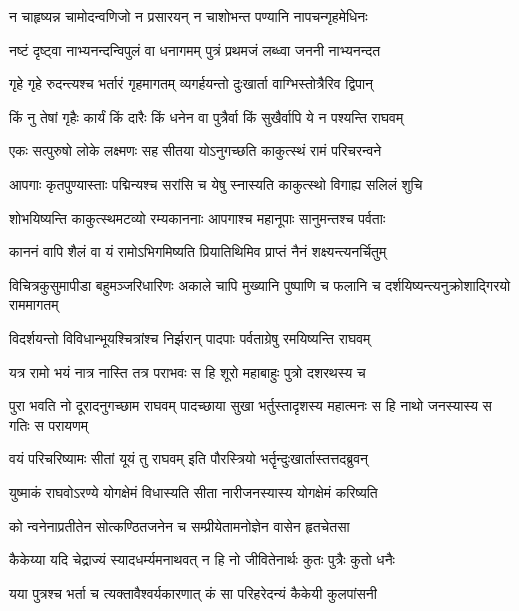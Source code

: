 \twolineshloka
{न चाहृष्यन्न चामोदन्वणिजो न प्रसारयन्}
{न चाशोभन्त पण्यानि नापचन्गृहमेधिनः} %

\twolineshloka
{नष्टं दृष्ट्वा नाभ्यनन्दन्विपुलं वा धनागमम्}
{पुत्रं प्रथमजं लब्ध्वा जननी नाभ्यनन्दत} %

\twolineshloka
{गृहे गृहे रुदन्त्यश्च भर्तारं गृहमागतम्}
{व्यगर्हयन्तो दुःखार्ता वाग्भिस्तोत्रैरिव द्विपान्} %

\twolineshloka
{किं नु तेषां गृहैः कार्यं किं दारैः किं धनेन वा}
{पुत्रैर्वा किं सुखैर्वापि ये न पश्यन्ति राघवम्} %

\twolineshloka
{एकः सत्पुरुषो लोके लक्ष्मणः सह सीतया}
{योऽनुगच्छति काकुत्स्थं रामं परिचरन्वने} %

\twolineshloka
{आपगाः कृतपुण्यास्ताः पद्मिन्यश्च सरांसि च}
{येषु स्नास्यति काकुत्स्थो विगाह्य सलिलं शुचि} %

\twolineshloka
{शोभयिष्यन्ति काकुत्स्थमटव्यो रम्यकाननाः}
{आपगाश्च महानूपाः सानुमन्तश्च पर्वताः} %

\twolineshloka
{काननं वापि शैलं वा यं रामोऽभिगमिष्यति}
{प्रियातिथिमिव प्राप्तं नैनं शक्ष्यन्त्यनर्चितुम्} %

\threelineshloka
{विचित्रकुसुमापीडा बहुमञ्जरिधारिणः}
{अकाले चापि मुख्यानि पुष्पाणि च फलानि च}
{दर्शयिष्यन्त्यनुक्रोशाद्गिरयो राममागतम्} %

\twolineshloka
{विदर्शयन्तो विविधान्भूयश्चित्रांश्च निर्झरान्}
{पादपाः पर्वताग्रेषु रमयिष्यन्ति राघवम्} %

\twolineshloka
{यत्र रामो भयं नात्र नास्ति तत्र पराभवः}
{स हि शूरो महाबाहुः पुत्रो दशरथस्य च} %

\threelineshloka
{पुरा भवति नो दूरादनुगच्छाम राघवम्}
{पादच्छाया सुखा भर्तुस्तादृशस्य महात्मनः}
{स हि नाथो जनस्यास्य स गतिः स परायणम्} %

\twolineshloka
{वयं परिचरिष्यामः सीतां यूयं तु राघवम्}
{इति पौरस्त्रियो भर्तॄन्दुःखार्तास्तत्तदब्रुवन्} %

\twolineshloka
{युष्माकं राघवोऽरण्ये योगक्षेमं विधास्यति}
{सीता नारीजनस्यास्य योगक्षेमं करिष्यति} %

\twolineshloka
{को न्वनेनाप्रतीतेन सोत्कण्ठितजनेन च}
{सम्प्रीयेतामनोज्ञेन वासेन हृतचेतसा} %

\twolineshloka
{कैकेय्या यदि चेद्राज्यं स्यादधर्म्यमनाथवत्}
{न हि नो जीवितेनार्थः कुतः पुत्रैः कुतो धनैः} %

\twolineshloka
{यया पुत्रश्च भर्ता च त्यक्तावैश्वर्यकारणात्}
{कं सा परिहरेदन्यं कैकेयी कुलपांसनी} %

